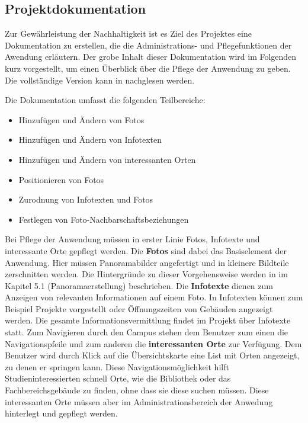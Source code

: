 \subsection{Projektdokumentation}
\label{sec:Projektdokumentation}

Zur Gewährleistung der Nachhaltigkeit ist es Ziel des Projektes eine Dokumentation zu erstellen, die die Administrations-
und Pflegefunktionen der Awendung erläutern. Der grobe Inhalt dieser Dokumentation wird im Folgenden kurz vorgestellt,
um einen Überblick über die Pflege der Anwendung zu geben. Die vollständige Version kann in
\citet{projektdokumentation2014} nachglesen werden.

Die Dokumentation umfasst die folgenden Teilbereiche:

\begin{itemize}
  \item Hinzufügen und Ändern von Fotos
  \item Hinzufügen und Ändern von Infotexten
  \item Hinzufügen und Ändern von interessanten Orten
  \item Positionieren von Fotos
  \item Zurodnung von Infotexten und Fotos
  \item Festlegen von Foto-Nachbarschaftsbeziehungen
\end{itemize}

Bei Pflege der Anwendung müssen in erster Linie Fotos, Infotexte und interessante Orte gepflegt werden. Die \textbf{Fotos}
sind dabei das Basiselement der Anwendung. Hier müssen Panoramabilder angefertigt und in kleinere Bildteile zerschnitten
werden. Die Hintergründe zu dieser Vorgehensweise werden in \citet{modelierungUndBetrieb2014} im
Kapitel 5.1 (Panoramaerstellung) beschrieben.
Die \textbf{Infotexte} dienen zum Anzeigen von relevanten Informationen auf einem Foto. In Infotexten können
zum Beispiel Projekte vorgestellt oder Öffnungszeiten von Gebäuden angezeigt werden. Die gesamte Informationsvermittlung
findet im Projekt über Infotexte statt.
Zum Navigieren durch den Campus stehen dem Benutzer zum einen die Navigationspfeile und zum anderen die
\textbf{interessanten Orte} zur Verfügung. Dem Benutzer wird durch Klick auf die Übersichtskarte eine List mit Orten
angezeigt, zu denen er springen kann. Diese Navigationsmöglichkeit hilft Studieninteressierten schnell Orte, wie die
Bibliothek oder das Fachbereichsgebäude zu finden, ohne dass sie diese suchen müssen. Diese interessanten Orte müssen
aber im Administrationsbereich der Anwedung hinterlegt und gepflegt werden.

